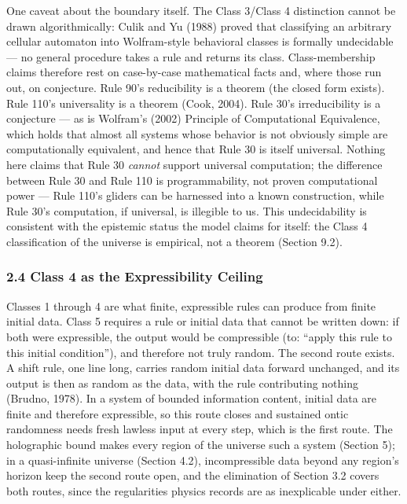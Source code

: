 \documentclass[
]{article}
\begin{document}
One caveat about the boundary itself. The Class 3/Class 4 distinction
cannot be drawn algorithmically: Culik and Yu (1988) proved that
classifying an arbitrary cellular automaton into Wolfram-style
behavioral classes is formally undecidable --- no general procedure
takes a rule and returns its class. Class-membership claims therefore
rest on case-by-case mathematical facts and, where those run out, on
conjecture. Rule 90's reducibility is a theorem (the closed form
exists). Rule 110's universality is a theorem (Cook, 2004). Rule 30's
irreducibility is a conjecture --- as is Wolfram's (2002) Principle of
Computational Equivalence, which holds that almost all systems whose
behavior is not obviously simple are computationally equivalent, and
hence that Rule 30 is itself universal. Nothing here claims that Rule 30
\emph{cannot} support universal computation; the difference between Rule
30 and Rule 110 is programmability, not proven computational power ---
Rule 110's gliders can be harnessed into a known construction, while
Rule 30's computation, if universal, is illegible to us. This
undecidability is consistent with the epistemic status the model claims
for itself: the Class 4 classification of the universe is empirical, not
a theorem (Section 9.2).

\hypertarget{class-4-as-the-expressibility-ceiling}{%
\subsubsection{2.4 Class 4 as the Expressibility
Ceiling}\label{class-4-as-the-expressibility-ceiling}}

Classes 1 through 4 are what finite, expressible rules can produce from
finite initial data. Class 5 requires a rule or initial data that cannot
be written down: if both were expressible, the output would be
compressible (to: ``apply this rule to this initial condition''), and
therefore not truly random. The second route exists. A shift rule, one
line long, carries random initial data forward unchanged, and its output
is then as random as the data, with the rule contributing nothing
(Brudno, 1978). In a system of bounded information content, initial data
are finite and therefore expressible, so this route closes and sustained
ontic randomness needs fresh lawless input at every step, which is the
first route. The holographic bound makes every region of the universe
such a system (Section 5); in a quasi-infinite universe (Section 4.2),
incompressible data beyond any region's horizon keep the second route
open, and the elimination of Section 3.2 covers both routes, since the
regularities physics records are as inexplicable under either.
\end{document}
